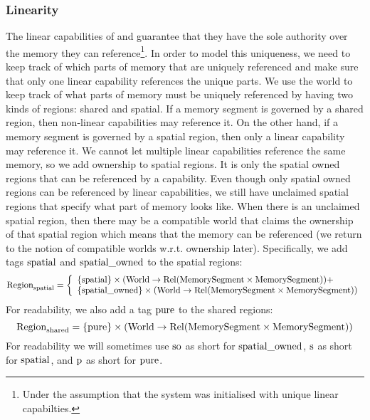 \begin{jversion}
\subsubsection{Linearity}
The linear capabilities of \srccm{} and \trgcm{} guarantee that they have the sole authority over the memory they can reference\footnote{Under the assumption that the system was initialised with unique linear capabilties.}.
In order to model this uniqueness, we need to keep track of which parts of memory that are uniquely referenced and make sure that only one linear capability references the unique parts.
We use the world to keep track of what parts of memory must be uniquely referenced by having two kinds of regions: shared and spatial.
If a memory segment is governed by a shared region, then non-linear capabilities may reference it.
On the other hand, if a memory segment is governed by a spatial region, then only a linear capability may reference it.
We cannot let multiple linear capabilities reference the same memory, so we add ownership to spatial regions.
It is only the spatial owned regions that can be referenced by a capability.
Even though only spatial owned regions can be referenced by linear capabilities, we still have unclaimed spatial regions that specify what part of memory looks like.
When there is an unclaimed spatial region, then there may be a compatible world  that claims the ownership of that spatial region which means that the memory can be referenced (we return to the notion of compatible worlds w.r.t. ownership later).
Specifically, we add tags $\mathrm{spatial}$ and $\mathrm{spatial\_owned}$ to the spatial regions:
\[
  \mathrm{Region}_\mathrm{spatial} = \left\{
  \begin{array}{l}
    \{\mathrm{spatial} \} \times (\mathrm{World} \rightarrow \mathrm{Rel}(\mathrm{MemorySegment} \times \mathrm{MemorySegment})) + \\
    \{\mathrm{spatial\_owned} \} \times (\mathrm{World} \rightarrow \mathrm{Rel}(\mathrm{MemorySegment} \times \mathrm{MemorySegment})) \\ 
  \end{array} \right.
\]
For readability, we also add a tag $\mathrm{pure}$ to the shared regions:
\[
  \mathrm{Region}_\mathrm{shared} = \{\mathrm{pure} \} \times (\mathrm{World} \rightarrow \mathrm{Rel}(\mathrm{MemorySegment} \times \mathrm{MemorySegment})) 
\]
For readability we will sometimes use $\mathrm{so}$ as short for $\mathrm{spatial\_owned}$, $\mathrm{s}$ as short for $\mathrm{spatial}$, and $\mathrm{p}$ as short for $\mathrm{pure}$.


\end{jversion}
